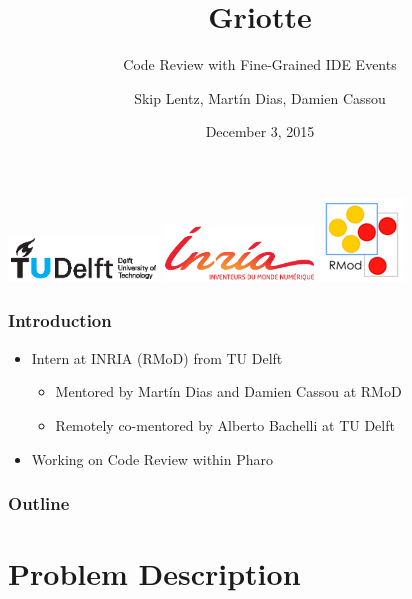 \documentclass[aspectratio=169]{beamer}
\title{Griotte}
\subtitle{Code Review with Fine-Grained IDE Events}
\author{Skip Lentz, Mart\'{i}n Dias, Damien Cassou}
\institute{TU Delft, INRIA Lille - Nord Europe}
\date{December 3, 2015}
\begin{document}
\begin{frame}

\titlepage
\centering
\includegraphics[width=40mm]{img/tu_delft_logo.eps}
\includegraphics[width=40mm]{img/inria_logo.eps}
\includegraphics{img/rmod_logo.png}

\end{frame}

\begin{frame}[fragile]

\frametitle{Introduction}

\begin{itemize}
\item Intern at INRIA (RMoD) from TU Delft
\begin{itemize}
\item Mentored by Mart\'{i}n Dias and Damien Cassou at RMoD
\item Remotely co-mentored by Alberto Bachelli at TU Delft
\end{itemize}

\item Working on Code Review within Pharo
\end{itemize}
\end{frame}

\begin{frame}[fragile]

\frametitle{Outline}

\tableofcontents%

\end{frame}

\section{Problem Description}
\end{document}
